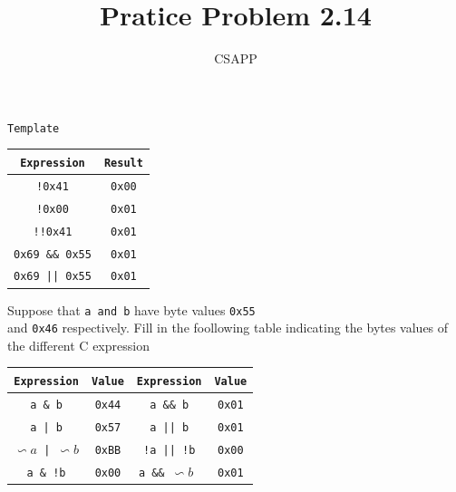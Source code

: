 \documentclass{article}
\title{Pratice Problem 2.14}
\author{CSAPP}
\begin{document}
    \maketitle

    \begin{center}
        \texttt{Template}\vspace{0.5em}\\
        \begin{tabular}{cc}
            \texttt{Expression} & \texttt{Result}\\
            \midrule
            \texttt{!0x41}          & \texttt{0x00}\\
            \texttt{!0x00}          & \texttt{0x01}\\
            \texttt{!!0x41}         & \texttt{0x01}\\
            \texttt{0x69 \&\& 0x55} & \texttt{0x01}\\
            \texttt{0x69 || 0x55}   & \texttt{0x01}\\
        \end{tabular} 
    \end{center}
    
    \begin{flushleft}
        Suppose that \texttt{a and b} have byte values \texttt{0x55}\\
        and \texttt{0x46} respectively. Fill in the foollowing table
        indicating the bytes values of the different C expression
        \smallskip

        \begin{tabular}{cccc}
            \texttt{Expression} & \texttt{Value} & \texttt{Expression} & \texttt{Value}\\
            \midrule
            \texttt{a \& b}     &  \texttt{0x44} & \texttt{a \&\& b}   &  \texttt{0x01}\\
            \texttt{a | b}      &  \texttt{0x57} & \texttt{a || b}     &  \texttt{0x01}\\
            \texttt{$\backsim a$ | $\backsim b$} & \texttt{0xBB} & \texttt{!a || !b}     &  \texttt{0x00}\\
            \texttt{a \& !b}     &  \texttt{0x00} & \texttt{a \&\& $\backsim b$ }   &  \texttt{0x01}\\
        \end{tabular}
    \end{flushleft}
    
\end{document}
